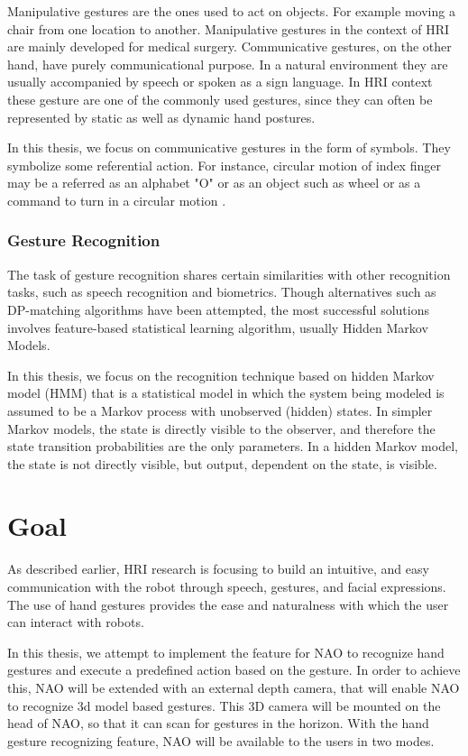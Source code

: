 Manipulative gestures are the ones used to act on objects. For example moving a chair from one location to another. Manipulative gestures in the context of HRI are mainly developed for medical surgery. Communicative gestures, on the other hand, have purely communicational purpose. In a natural environment they are usually accompanied by speech or spoken as a sign language. In HRI context these gesture are one of the commonly used gestures, since they can often be represented by static as well as dynamic hand postures.

In this thesis, we focus on communicative gestures in the form of symbols. They symbolize some referential action. For instance, circular motion of index finger may be a referred as an alphabet "O" or as an object such as wheel or as a command to turn in a circular motion .


\subsection{Gesture Recognition}
The task of gesture recognition shares certain similarities with other recognition tasks, such as speech recognition and biometrics. Though alternatives such as DP-matching algorithms have been attempted, the most successful solutions involves feature-based statistical learning algorithm, usually Hidden Markov Models. 

In this thesis, we focus on the recognition technique based on hidden Markov model (HMM) that is a statistical model in which the system being modeled is assumed to be a Markov process with unobserved (hidden) states. In simpler Markov models, the state is directly visible to the observer, and therefore the state transition probabilities are the only parameters. In a hidden Markov model, the state is not directly visible, but output, dependent on the state, is visible.


\chapter{Goal} As described earlier, HRI research is focusing to build an intuitive, and easy communication with the robot through speech, gestures, and facial expressions. The use of hand gestures provides the ease and naturalness with which the user can interact with robots.

In this thesis, we attempt to implement the feature for NAO to recognize hand gestures and execute a predefined action based on the gesture. In order to achieve this, NAO will be extended with an external depth camera, that will enable NAO to recognize 3d model based gestures. This 3D camera will be mounted on the head of NAO, so that it can scan for gestures in the horizon. With the hand gesture recognizing feature, NAO will be available to the users in two modes.

